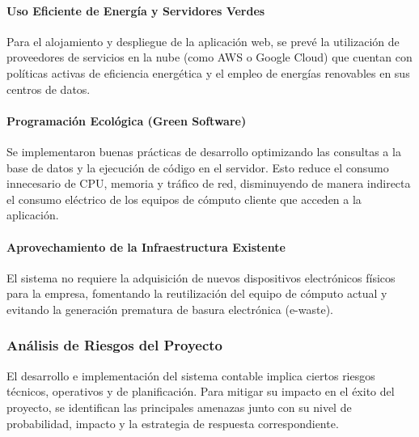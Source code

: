 \paragraph{Uso Eficiente de Energía y Servidores Verdes}
Para el alojamiento y despliegue de la aplicación web, se prevé la utilización de proveedores de servicios en la nube (como AWS o Google Cloud) que cuentan con políticas activas de eficiencia energética y el empleo de energías renovables en sus centros de datos.

\paragraph{Programación Ecológica (Green Software)}
Se implementaron buenas prácticas de desarrollo optimizando las consultas a la base de datos y la ejecución de código en el servidor. Esto reduce el consumo innecesario de CPU, memoria y tráfico de red, disminuyendo de manera indirecta el consumo eléctrico de los equipos de cómputo cliente que acceden a la aplicación.

\paragraph{Aprovechamiento de la Infraestructura Existente}
El sistema no requiere la adquisición de nuevos dispositivos electrónicos físicos para la empresa, fomentando la reutilización del equipo de cómputo actual y evitando la generación prematura de basura electrónica (e-waste).

\subsubsection{Análisis de Riesgos del Proyecto}

El desarrollo e implementación del sistema contable implica ciertos riesgos técnicos, operativos y de planificación. Para mitigar su impacto en el éxito del proyecto, se identifican las principales amenazas junto con su nivel de probabilidad, impacto y la estrategia de respuesta correspondiente.

